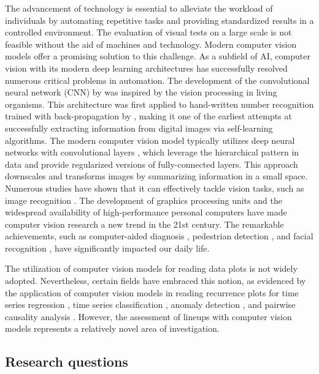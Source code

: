 \documentclass[11pt,a4paper,]{article}
\begin{document}
The advancement of technology is essential to alleviate the workload of individuals by automating repetitive tasks and providing standardized results in a controlled environment. The evaluation of visual tests on a large scale is not feasible without the aid of machines and technology. Modern computer vision models offer a promising solution to this challenge. As a subfield of AI, computer vision with its modern deep learning architectures has successfully resolved numerous critical problems in automation. The development of the convolutional neural network (CNN) by \textcite{fukushima_neocognitron_1982} was inspired by the vision processing in living organisms. This architecture was first applied to hand-written number recognition trained with back-propagation by \textcite{lecun_backpropagation_1989}, making it one of the earliest attempts at successfully extracting information from digital images via self-learning algorithms. The modern computer vision model typically utilizes deep neural networks with convolutional layers \autocite{fukushima_neocognitron_1982}, which leverage the hierarchical pattern in data and provide regularized versions of fully-connected layers. This approach downscales and transforms images by summarizing information in a small space. Numerous studies have shown that it can effectively tackle vision tasks, such as image recognition \autocite{rawat_deep_2017}. The development of graphics processing units and the widespread availability of high-performance personal computers have made computer vision research a new trend in the 21st century. The remarkable achievements, such as computer-aided diagnosis \autocite{lee_image_2015}, pedestrian detection \autocite{brunetti_computer_2018}, and facial recognition \autocite{emami_facial_2012}, have significantly impacted our daily life.

The utilization of computer vision models for reading data plots is not widely adopted. Nevertheless, certain fields have embraced this notion, as evidenced by the application of computer vision models in reading recurrence plots for time series regression \autocite{ojeda_multivariate_2020}, time series classification \autocite{chu_automatic_2019,hailesilassie_financial_2019,hatami_classification_2018,zhang_encoding_2020}, anomaly detection \autocite{chen_convolutional_2020}, and pairwise causality analysis \autocite{singh_deep_2017}. However, the assessment of lineups with computer vision models represents a relatively novel area of investigation.

\hypertarget{research-questions}{%
\subsection{Research questions}\label{research-questions}}
\end{document}

